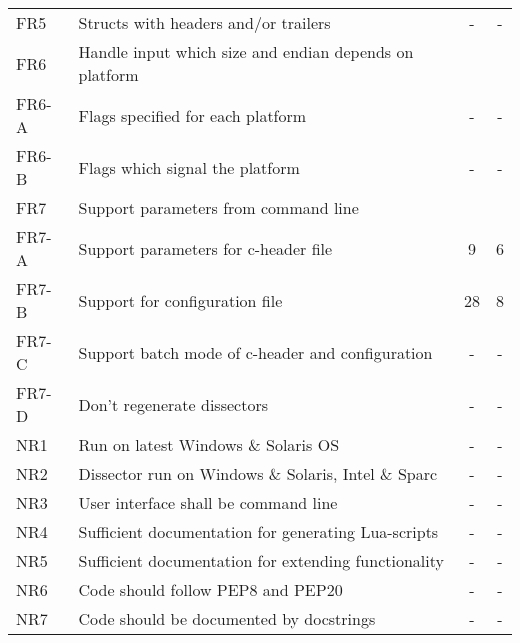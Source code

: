 \begin{table}[ht]
\begin{tabularx}{\textwidth}{l X c c}
	\addlinespace
	FR5 & Structs with headers and/or trailers & - & - \\
	\addlinespace
	FR6 & Handle input which size and endian depends on platform & & \\
	FR6-A & Flags specified for each platform & - & - \\
	FR6-B & Flags which signal the platform & - & - \\
	\addlinespace
	FR7 & Support parameters from command line & & \\
	FR7-A & Support parameters for c-header file & 9 & 6 \\
	FR7-B & Support for configuration file & 28 & 8 \\
	FR7-C & Support batch mode of c-header and configuration & - & - \\
	FR7-D & Don't regenerate dissectors & - & - \\
	\addlinespace
	NR1 & Run on latest Windows \& Solaris OS & - & - \\
	NR2 & Dissector run on Windows \& Solaris, Intel \& Sparc & - & - \\
	NR3 & User interface shall be command line & - & - \\
	NR4 & Sufficient documentation for generating Lua-scripts & - & - \\
	NR5 & Sufficient documentation for extending functionality & - & - \\
	NR6 & Code should follow PEP8 and PEP20 & - & - \\
	NR7 & Code should be documented by docstrings & - & - \\
	\bottomrule
\end{tabularx}
\end{table}

